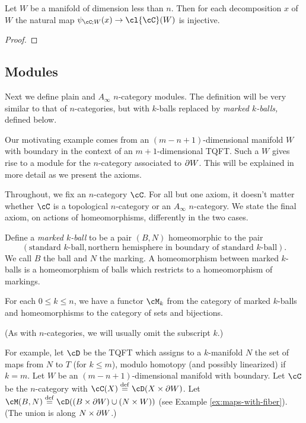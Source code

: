\begin{lem}
\label{lem:colim-injective}
Let $W$ be a manifold of dimension less than $n$.  Then for each
decomposition $x$ of $W$ the natural map $\psi_{\cC;W}(x)\to \cl{\cC}(W)$ is injective.
\end{lem}
\begin{proof}
\end{proof}


\subsection{Modules}

Next we define plain and $A_\infty$ $n$-category modules.
The definition will be very similar to that of $n$-categories,
but with $k$-balls replaced by {\it marked $k$-balls,} defined below.

Our motivating example comes from an $(m{-}n{+}1)$-dimensional manifold $W$ with boundary
in the context of an $m{+}1$-dimensional TQFT.
Such a $W$ gives rise to a module for the $n$-category associated to $\partial W$.
This will be explained in more detail as we present the axioms.

Throughout, we fix an $n$-category $\cC$.
For all but one axiom, it doesn't matter whether $\cC$ is a topological $n$-category or an $A_\infty$ $n$-category.
We state the final axiom, on actions of homeomorphisms, differently in the two cases.

Define a {\it marked $k$-ball} to be a pair $(B, N)$ homeomorphic to the pair
$$(\text{standard $k$-ball}, \text{northern hemisphere in boundary of standard $k$-ball}).$$
We call $B$ the ball and $N$ the marking.
A homeomorphism between marked $k$-balls is a homeomorphism of balls which
restricts to a homeomorphism of markings.

\begin{module-axiom}
{For each $0 \le k \le n$, we have a functor $\cM_k$ from 
the category of marked $k$-balls and 
homeomorphisms to the category of sets and bijections.}
\end{module-axiom}

(As with $n$-categories, we will usually omit the subscript $k$.)

For example, let $\cD$ be the TQFT which assigns to a $k$-manifold $N$ the set 
of maps from $N$ to $T$ (for $k\le m$), modulo homotopy (and possibly linearized) if $k=m$.
Let $W$ be an $(m{-}n{+}1)$-dimensional manifold with boundary.
Let $\cC$ be the $n$-category with $\cC(X) \deq \cD(X\times \bd W)$.
Let $\cM(B, N) \deq \cD((B\times \bd W)\cup (N\times W))$
(see Example \ref{ex:maps-with-fiber}).
(The union is along $N\times \partial W$.)

